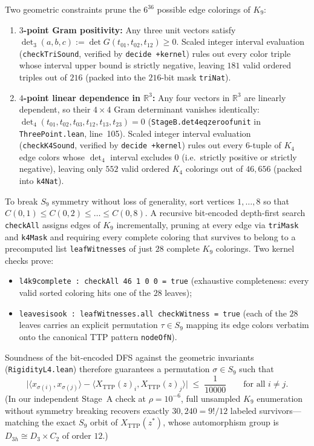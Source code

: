 \documentclass[11pt,reqno]{amsart}
\renewcommand{\_}{\origunderscore\allowbreak}
\theoremstyle{definition}
\newcommand{\R}{\mathbb{R}}
\newcommand{\ip}[2]{\langle #1, #2 \rangle}
\newcommand{\TTP}{X_{\mathrm{TTP}}}
\begin{document}
Two geometric constraints prune the $6^{36}$ possible edge colorings of $K_9$:
\begin{enumerate}[leftmargin=2.2em]
  \item \textbf{$3$-point Gram positivity:} Any three unit vectors satisfy $\det_3(a,b,c) := \det G(t_{01}, t_{02}, t_{12}) \ge 0$. Scaled integer interval evaluation (\texttt{checkTriSound}, verified by \texttt{decide +kernel}) rules out every color triple whose interval upper bound is strictly negative, leaving $181$ valid ordered triples out of $216$ (packed into the $216$-bit mask \texttt{triNat}).
  \item \textbf{$4$-point linear dependence in $\R^3$:} Any four vectors in $\R^3$ are linearly dependent, so their $4\times 4$ Gram determinant vanishes identically: $\det_4(t_{01}, t_{02}, t_{03}, t_{12}, t_{13}, t_{23}) = 0$ (\texttt{StageB.det4\_eq\_zero\_of\_unit} in \texttt{ThreePoint.lean}, line~105). Scaled integer interval evaluation (\texttt{checkK4Sound}, verified by \texttt{decide +kernel}) rules out every $6$-tuple of $K_4$ edge colors whose $\det_4$ interval excludes $0$ (i.e.\ strictly positive or strictly negative), leaving only $552$ valid ordered $K_4$ colorings out of $46{,}656$ (packed into \texttt{k4Nat}).
\end{enumerate}

To break $S_9$ symmetry without loss of generality, sort vertices $1,\dots,8$ so that $C(0,1) \le C(0,2) \le \dots \le C(0,8)$.
A recursive bit-encoded depth-first search \texttt{checkAll} assigns edges of $K_9$ incrementally, pruning at every edge via \texttt{triMask} and \texttt{k4Mask} and requiring every complete coloring that survives to belong to a precomputed list \texttt{leafWitnesses} of just $28$ complete $K_9$ colorings.
Two kernel checks prove:
\begin{itemize}[leftmargin=2em]
  \item \texttt{l4\_k9\_complete : checkAll 46 1 0 0 = true} (exhaustive completeness: every valid sorted coloring hits one of the $28$ leaves);
  \item \texttt{leaves\_iso\_ok : leafWitnesses.all checkWitness = true} (each of the $28$ leaves carries an explicit permutation $\tau \in S_9$ mapping its edge colors verbatim onto the canonical TTP pattern \texttt{nodeOfN}).
\end{itemize}
Soundness of the bit-encoded DFS against the geometric invariants (\texttt{RigidityL4.lean}) therefore guarantees a permutation $\sigma \in S_9$ such that
\begin{equation}\label{eq:gram-window}
  \bigl|\ip{x_{\sigma(i)}}{x_{\sigma(j)}} - \ip{\TTP(z)_i}{\TTP(z)_j}\bigr| \;\le\; \frac{1}{10000}
  \qquad \text{for all } i \ne j.
\end{equation}
(In our independent Stage~A check at $\rho = 10^{-6}$, full unsampled $K_9$ enumeration without symmetry breaking recovers exactly $30{,}240 = 9!/12$ labeled survivors---matching the exact $S_9$ orbit of $\TTP(z^*)$, whose automorphism group is $D_{3h} \cong D_3 \times C_2$ of order $12$.)
\end{document}
